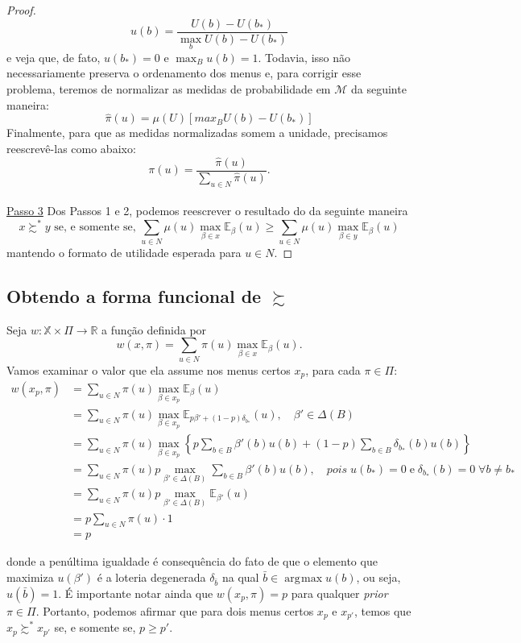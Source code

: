 \documentclass[12pt, a4paper]{article}
\theoremstyle{nonumberplain}
\newtheorem{proof}{Dem.}
\theoremstyle{plain}
\theoremstyle{plain}
\theoremstyle{plain}
\theoremstyle{nonumberplain}
\DeclareMathOperator*{\argmax}{\arg\!\max}
\begin{document}
\begin{proof}
$$u(b)=\frac{U(b)-U(b_*)}{\max_b U(b)-U(b_*)}$$
e veja que, de fato, $u(b_*)=0$ e $\max_{B} u(b)=1$. Todavia, isso não necessariamente preserva o ordenamento dos menus e, para corrigir esse problema, teremos de normalizar as medidas de probabilidade em $\mathcal{M}$ da seguinte maneira:
$$ \hat{\pi}(u)=\mu(U)\left[max_B U(b)-U(b_*)\right]$$ Finalmente, para que as medidas normalizadas somem a unidade, precisamos reescrevê-las como abaixo: \[\pi(u)=\frac{\hat{\pi}(u)}{\sum_{u\in N}\hat{\pi}(u)}.\]\\
\noindent
\underline{Passo 3} Dos Passos 1 e 2, podemos reescrever o resultado do  da seguinte maneira $$x\succsim^* y \text{ se, e somente se, } \sum_{u\in N} \mu(u)\max_{\beta\in x}\mathbb{E}_\beta(u) \geq \sum_{u\in N} \mu(u)\max_{\beta\in y}\mathbb{E}_\beta(u)$$
mantendo o formato de utilidade esperada para $u\in N$.
\end{proof}

\subsection{Obtendo a forma funcional de $\succsim$}
Seja $w:\mathbb{X}\times \Pi\rightarrow \mathbb{R}$ a função definida por $$w(x,\pi)=\sum_{u\in N} \pi(u)\max_{\beta\in x}\mathbb{E}_\beta(u).$$ Vamos examinar o valor que ela assume nos menus certos $x_p$, para cada $\pi\in\Pi$:
\begin{align*}
w(x_p,\pi)&=\sum_{u\in N} \pi(u)\max_{\beta\in x_{p}}\mathbb{E}_\beta(u)\\
&= \sum_{u\in N} \pi(u)\max_{\beta\in x_{p}}\mathbb{E}_{p\beta'+(1-p)\delta_{b_*}}(u),\quad \beta'\in \Delta(B)\\
&=\sum_{u\in N} \pi(u)\max_{\beta\in x_{p}}\left\lbrace p \sum_{b\in B}\beta'(b)u(b)+(1-p)\sum_{b\in B}\delta_{b_*}(b)u(b)\right\rbrace \\
&=\sum_{u\in N} \pi(u)p\max_{\beta'\in \Delta(B)}\sum_{b\in B}\beta'(b)u(b), \quad pois \; u(b_*)=0\; \text{e}\; \delta_{b_*}(b)=0\; \forall b\neq b_*\\
&= \sum_{u\in N} \pi(u) p \max_{\beta'\in \Delta(B)} \mathbb{E}_{\beta'}(u)\\
&= p\sum_{u\in N}\pi(u)\cdot 1\\
&=p
\end{align*}

donde a penúltima igualdade é consequência do fato de que o elemento que maximiza $u(\beta')$ é a loteria degenerada $\delta_{\bar{b}}$ na qual $\bar{b}\in\argmax u(b)$, ou seja, $u(\bar{b})=1$. É importante notar ainda que $w(x_p,\pi)=p$ para qualquer \textit{prior} $\pi\in\Pi$. Portanto, podemos afirmar que para dois menus certos $x_p$ e $x_{p'}$, temos que $x_p\succsim^* x_{p'}$ se, e somente se, $p\geq p'$.
\end{document}
